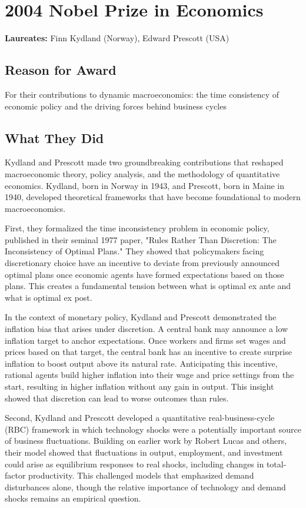 \chapter{2004 Nobel Prize in Economics}
\textbf{Laureates: }Finn Kydland (Norway), Edward Prescott (USA)

\section*{Reason for Award}
For their contributions to dynamic macroeconomics: the time consistency of
economic policy and the driving forces behind business cycles

\section{What They Did}
Kydland and Prescott made two groundbreaking contributions that reshaped
macroeconomic theory, policy analysis, and the methodology of quantitative economics.
Kydland, born in Norway in 1943, and Prescott, born in Maine in 1940, developed
theoretical frameworks that have become foundational to modern macroeconomics.

First, they formalized the time inconsistency problem in economic policy,
published in their seminal 1977 paper, "Rules Rather Than Discretion: The
Inconsistency of Optimal Plans." They showed that policymakers facing
discretionary choice have an incentive to deviate from previously announced
optimal plans once economic agents have formed expectations based on those
plans. This creates a fundamental tension between what is optimal ex ante
and what is optimal ex post.

In the context of monetary policy, Kydland and Prescott demonstrated the
inflation bias that arises under discretion. A central bank may announce a
low inflation target to anchor expectations. Once workers and firms set wages
and prices based on that target, the central bank has an incentive to create
surprise inflation to boost output above its natural rate. Anticipating this
incentive, rational agents build higher inflation into their wage and price
settings from the start, resulting in higher inflation without any gain in
output. This insight showed that discretion can lead to worse outcomes than
rules.

Second, Kydland and Prescott developed a quantitative real-business-cycle (RBC)
framework in which technology shocks were a potentially important source of
business fluctuations. Building on earlier work by Robert Lucas and others,
their model showed that fluctuations in output, employment, and investment could
arise as equilibrium responses to real shocks, including changes in total-factor
productivity. This challenged models that emphasized demand disturbances alone,
though the relative importance of technology and demand shocks remains an
empirical question.

